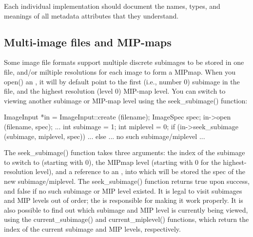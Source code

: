 Each individual \ImageInput implementation should document the names,
types, and meanings of all metadata attributes that they understand.


%


%


\subsection{Multi-image files and MIP-maps}
\label{sec:imageinput:multiimage}
\label{sec:imageinput:mipmap}

Some image file formats support multiple discrete subimages to be stored
in one file, and/or miltiple resolutions for each image to form a
MIPmap.  When you {\cf open()} an \ImageInput, it will by default point
to the first (i.e., number 0) subimage in the file, and the highest
resolution (level 0) MIP-map level.  You can switch to viewing another
subimage or MIP-map level using the {\cf seek_subimage()} function:

\begin{code}
        ImageInput *in = ImageInput::create (filename);
        ImageSpec spec;
        in->open (filename, spec);
        ...
        int subimage = 1;
        int miplevel = 0;
        if (in->seek_subimage (subimage, miplevel, spec)) {
            ...
        } else {
            ... no such subimage/miplevel ...
        }
\end{code}

The {\cf seek_subimage()} function takes three arguments: the index of
the subimage to switch to (starting with 0), the MIPmap level (starting
with 0 for the highest-resolution level), and a reference to an
\ImageSpec, into which will be stored the spec of the new
subimage/miplevel.  The {\cf seek_subimage()} function returns {\cf
  true} upon success, and {\cf false} if no such subimage or MIP level
existed.  It is legal to visit subimages and MIP levels out of order;
the \ImageInput is responsible for making it work properly.  It is also
possible to find out which subimage and MIP level is currently being
viewed, using the {\cf current_subimage()} and {\cf current_miplevel()}
functions, which return the index of the current subimage and MIP
levels, respectively.

